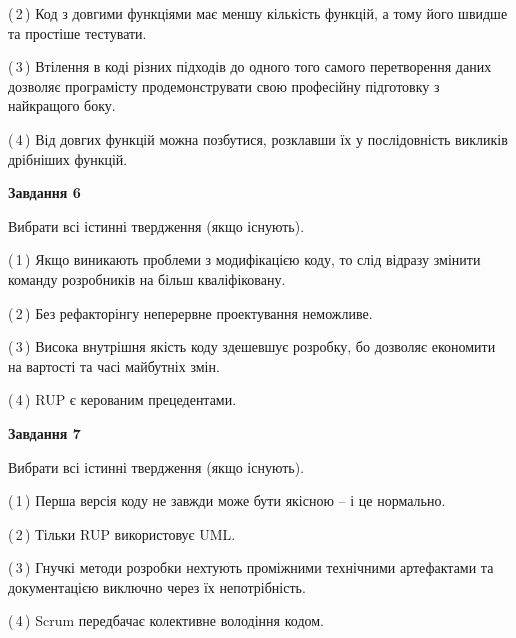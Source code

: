 \documentclass[10pt, ukrainian]{article}
\begin{document}
{\begin {large}
(\,2\,) Код з довгими функціями має меншу кількість функцій, а тому його швидше та простіше тестувати. %



(\,3\,) Втілення в коді різних підходів до одного того самого перетворення даних дозволяє програмісту продемонструвати свою професійну підготовку з найкращого боку. %



(\,4\,) Від довгих функцій можна позбутися, розклавши їх у послідовність викликів дрібніших функцій. %

\newpage

{\begin {center}\textbf{Завдання 6}\end {center}}\par
Вибрати всі істинні твердження (якщо існують).\par
\vspace{2mm}



(\,1\,) Якщо виникають проблеми з модифікацією коду, то слід відразу змінити команду розробників на більш кваліфіковану.%



(\,2\,) Без рефакторінгу неперервне проектування неможливе. %



(\,3\,) Висока внутрішня якість коду здешевшує розробку, бо дозволяє економити на вартості та часі майбутніх змін. %



(\,4\,) RUP є керованим прецедентами. %


{\begin {center}\textbf{Завдання 7}\end {center}}\par
Вибрати всі істинні твердження (якщо існують).\par
\vspace{2mm}



(\,1\,) Перша версія коду не завжди може бути якісною -- і це нормально. %



(\,2\,) Тільки RUP використовує UML.%



(\,3\,) Гнучкі методи розробки нехтують проміжними технічними артефактами та документацією виключно через їх непотрібність. %



(\,4\,) Scrum передбачає колективне володіння кодом. %



\end{large}}
\end{document}
